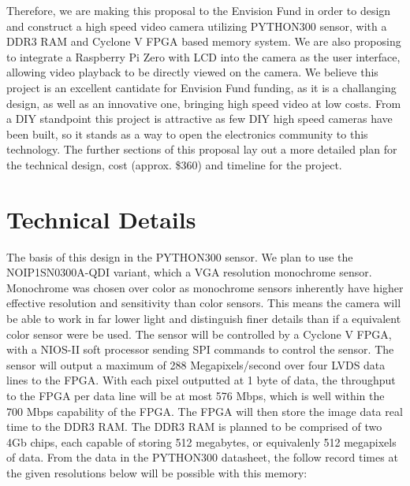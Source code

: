 \documentclass[12pt]{article}
\begin{document}
Therefore, we are making this proposal to the Envision Fund in order to design and construct a high speed video camera utilizing PYTHON300 sensor, with a DDR3 RAM and Cyclone V FPGA based memory system. We are also proposing to integrate a Raspberry Pi Zero with LCD into the camera as the user interface, allowing video playback to be directly viewed on the camera. We believe this project is an excellent cantidate for Envision Fund funding, as it is a challanging design, as well as an innovative one, bringing high speed video at low costs. From a DIY standpoint this project is attractive as few DIY high speed cameras have been built, so it stands as a way to open the electronics community to this technology. The further sections of this proposal lay out a more detailed plan for the technical design, cost (approx. \$360) and timeline for the project.

\section{Technical Details}
The basis of this design in the PYTHON300 sensor. We plan to use the NOIP1SN0300A-QDI variant, which a VGA resolution monochrome sensor. Monochrome was chosen over color as monochrome sensors inherently have higher effective resolution and sensitivity than color sensors. This means the camera will be able to work in far lower light and distinguish finer details than if a equivalent color sensor were be used. The sensor will be controlled by a Cyclone V FPGA, with a NIOS-II soft processor sending SPI commands to control the sensor. The sensor will output a maximum of 288 Megapixels/second over four LVDS data lines to the FPGA. With each pixel outputted at 1 byte of data, the throughput to the FPGA per data line will be at most 576 Mbps, which is well within the 700 Mbps capability of the FPGA. The FPGA will then store the image data real time to the DDR3 RAM. The DDR3 RAM is planned to be comprised of two 4Gb chips, each capable of storing 512 megabytes, or equivalenly 512 megapixels of data. From the data in the PYTHON300 datasheet, the follow record times at the given resolutions below will be possible with this memory:
\end{document}
